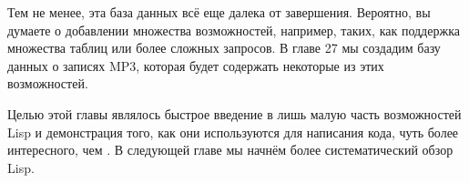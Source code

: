 Тем не менее, эта база данных всё еще далека от завершения. Вероятно, вы думаете о
добавлении множества возможностей, например, таких, как поддержка множества таблиц или
более сложных запросов. В главе 27 мы создадим базу данных о записях MP3, которая будет
содержать некоторые из этих возможностей.

Целью этой главы являлось быстрое введение в лишь малую часть возможностей Lisp и
демонстрация того, как они используются для написания кода, чуть более интересного, чем
. В следующей главе мы начнём более систематический обзор Lisp.

